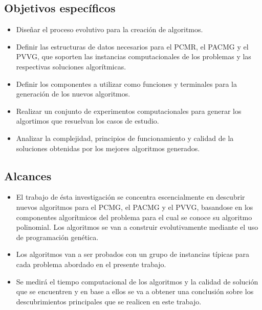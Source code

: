 \subsection{Objetivos específicos}
\begin{itemize}

    \item Diseñar el proceso evolutivo para la creación de algoritmos.

    \item Definir las estructuras de datos necesarios para el PCMR, el PACMG y el PVVG, que soporten las instancias computacionales de los problemas y las respectivas soluciones algorítmicas.

    \item Definir los componentes a utilizar como funciones y terminales para la generación de los nuevos algoritmos.

    \item Realizar un conjunto de experimentos computacionales para generar los algortimos que resuelvan los casos de estudio.

    \item Analizar la complejidad, principios de funcionamiento y calidad de la soluciones obtenidas por los mejores algoritmos generados.

\end{itemize}


\subsection{Alcances}

\begin{itemize}

    \item El trabajo de ésta investigación se concentra escencialmente en descubrir nuevos algoritmos para el PCMG, el PACMG  y el PVVG, basandose en los componentes algorítmicos del problema para el cual se conoce su algoritmo polinomial. Los algoritmos se van a construir evolutivamente mediante el uso de programación genética.

    \item Los algoritmos van a ser probados con un grupo de instancias típicas para cada problema abordado en el presente trabajo.

     \item Se medirá el tiempo computacional de los algoritmos y la calidad de solución que se encuentren y en base a ellos se va a obtener una conclusión sobre los descubrimientos principales que se realicen en este trabajo.

  \end{itemize}



